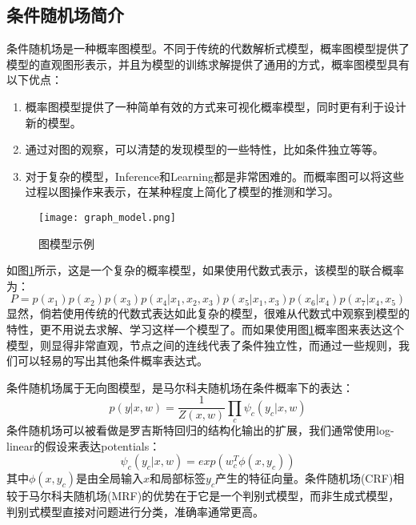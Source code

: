 \subsection{条件随机场简介}
条件随机场是一种概率图模型。不同于传统的代数解析式模型，概率图模型提供了模型的直观图形表示，并且为模型的训练求解提供了通用的方式，概率图模型具有以下优点\cite{bishop2006pattern}：
\begin{enumerate}
\item 概率图模型提供了一种简单有效的方式来可视化概率模型，同时更有利于设计新的模型。
\item 通过对图的观察，可以清楚的发现模型的一些特性，比如条件独立等等。
\item 对于复杂的模型，Inference和Learning都是非常困难的。而概率图可以将这些过程以图操作来表示，在某种程度上简化了模型的推测和学习。
\end{enumerate}

\begin{figure}
\centering
\texttt{[image: graph\_model.png]}
\caption{图模型示例}\label{fig:graph_model}
\end{figure}

如图\ref{fig:graph_model}所示，这是一个复杂的概率模型，如果使用代数式表示，该模型的联合概率为：
\begin{equation}
P = p(x_1)p(x_2)p(x_3)p(x_4|x_1,x_2,x_3)p(x_5|x_1,x_3)p(x_6|x_4)p(x_7|x_4,x_5)
\end{equation}
显然，倘若使用传统的代数式表达如此复杂的模型，很难从代数式中观察到模型的特性，更不用说去求解、学习这样一个模型了。而如果使用图\ref{fig:graph_model}概率图来表达这个模型，则显得非常直观，节点之间的连线代表了条件独立性，而通过一些规则，我们可以轻易的写出其他条件概率表达式。

条件随机场属于无向图模型，是马尔科夫随机场在条件概率下的表达：
\begin{equation}
p(y|x,w)=\frac{1}{Z(x,w)}\prod_c \psi_c(y_c|x, w)
\end{equation}
条件随机场可以被看做是罗吉斯特回归的结构化输出的扩展\cite{murphy2012machine}，我们通常使用log-linear的假设来表达potentials：
\begin{equation}
\psi_c(y_c|x,w)=exp(w_c^T \phi(x,y_c))
\end{equation}
其中$\phi(x,y_c)$是由全局输入$x$和局部标签$y_c$产生的特征向量。条件随机场(CRF)相较于马尔科夫随机场(MRF)的优势在于它是一个判别式模型，而非生成式模型，判别式模型直接对问题进行分类，准确率通常更高。

